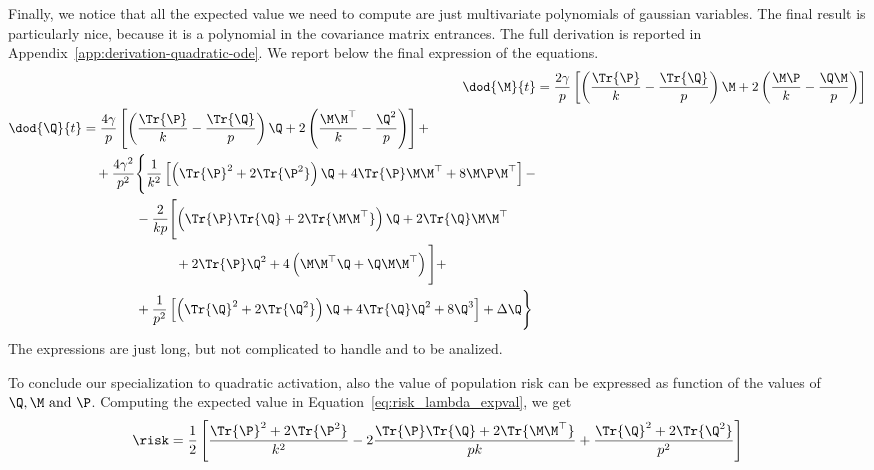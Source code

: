 Finally, we notice that all the expected value we need to compute are just multivariate
polynomials of gaussian variables. The final result is particularly nice,
because it is a polynomial in the covariance matrix entrances. The full derivation
is reported in Appendix~\ref{app:derivation-quadratic-ode}.
We report below the final expression of the equations.
\begin{subequations} \label{eq:quadraticODEs}\begin{align}
    \label{eq:quadraticODE_M}
    \dod{\M}{t} &= \frac{2 \gamma}{p}\left[
        \left(\frac{\Tr{\P}}k - \frac{\Tr{\Q}}p\right)\M +
        2\left(\frac{\M\P}{k} - \frac{\Q\M}{p}\right)
    \right] \\
    \label{eq:quadraticODE_Q}
    \begin{split}
        \dod{\Q}{t} &= \frac{4 \gamma}{p}\left[
            \left(\frac{\Tr{\P}}k - \frac{\Tr{\Q}}p\right)\Q +
            2\left(\frac{\M\M^\top}{k} - \frac{\Q^2}{p}\right)
        \right] +\\
        &\quad+\frac{4 \gamma^2}{p^2} \Biggr\{
            \frac1{k^2}\left[\left(\Tr{\P}^2+2\Tr{\P^2}\right)\Q +
                            4\Tr{\P}\M\M^\top + 8\M\P\M^\top
                    \right] - \\
            &\qquad\quad\quad
            -\frac2{kp}\Biggl[\left(\Tr{\P}\Tr{\Q}+2\Tr{\M\M^\top}\right)\Q +
                            2\Tr{\Q}\M\M^\top\\
                            &\qquad\qquad\qquad\quad+ 2\Tr{\P}\Q^2+ 
                            4\left(\M\M^\top\Q + \Q\M\M^\top\right)
                        \Biggl] + \\
            &\qquad\quad\quad
            +\frac1{p^2}\left[\left(\Tr{\Q}^2+2\Tr{\Q^2}\right)\Q +
                            4\Tr{\Q}\Q^2 + 8\Q^3
                        \right] + \Delta \Q\Biggr\}
    \end{split}
\end{align}\end{subequations}
The expressions are just long, but not complicated to handle and to be analized.

To conclude our specialization to quadratic activation, also the value of population risk can be expressed
as function of the values of \(\Q, \M \text{ and } \P\). Computing the expected value in Equation~\eqref{eq:risk_lambda_expval},
we get
\begin{equation} \label{eq:risk_quadratic}
  \risk%
      = \frac12\left[
          \frac{\Tr{\P}^2+2\Tr{\P^2}}{k^2}
          -2\frac{\Tr{\P}\Tr{\Q}+2\Tr{\M\M^\top}}{pk}
          +\frac{\Tr{\Q}^2+2\Tr{\Q^2}}{p^2}
      \right]
\end{equation}

